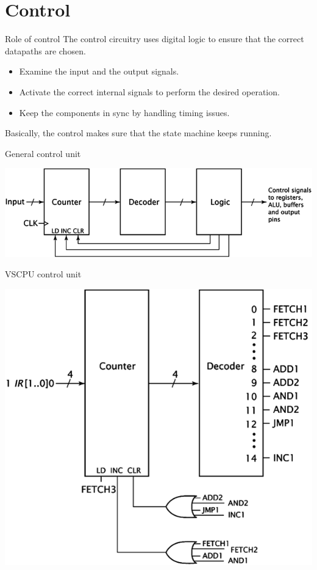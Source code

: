 \section{Control}

\begin{frame}{Role of control}
  The control circuitry uses digital logic to ensure that the correct datapaths are chosen.
  \begin{itemize}
    \item Examine the input and the output signals.
    \item Activate the correct internal signals to perform the desired operation.
    \item Keep the components in sync by handling timing issues.
  \end{itemize}
  Basically, the control makes sure that the state machine keeps running.
\end{frame}

\begin{frame}{General control unit}
  \begin{center}
    \includegraphics[scale=0.4]{GenericControlUnit}
  \end{center}
\end{frame}

\begin{frame}{VSCPU control unit}
  \begin{center}
    \includegraphics[scale=0.4]{VSCPUControlUnit}
  \end{center}
\end{frame}

